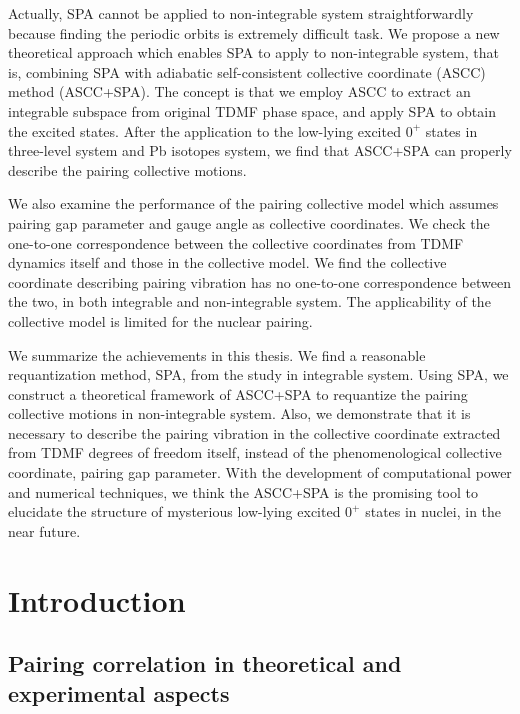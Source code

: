 \documentclass[11pt]{book} %
\begin{document}
Actually, SPA cannot be applied to non-integrable system straightforwardly because finding the periodic orbits is extremely difficult task. We propose a new theoretical approach which enables SPA to apply to non-integrable system, that is, combining SPA with adiabatic self-consistent collective coordinate (ASCC) method (ASCC+SPA). The concept is that we employ ASCC to extract an integrable subspace from original TDMF phase space, and apply SPA to obtain the excited states. 
After the application to the low-lying excited $0^+$ states in three-level system and Pb isotopes system, we find that ASCC+SPA can properly describe the pairing collective motions. 

We also examine the performance of the pairing collective model which assumes pairing gap parameter and gauge angle as collective coordinates. We check the one-to-one correspondence between the collective coordinates from TDMF dynamics itself and those in the collective model. We find the collective coordinate describing pairing vibration has no one-to-one correspondence between the two, in both integrable and non-integrable system. The applicability of the collective model is limited for the nuclear pairing.

We summarize the achievements in this thesis. We find a reasonable requantization method, SPA, from the study in integrable system. Using SPA, we construct a theoretical framework of ASCC+SPA to requantize the pairing collective motions in non-integrable system. Also, we demonstrate that it is necessary to describe the pairing vibration in the collective coordinate extracted from TDMF degrees of freedom itself, instead of the phenomenological collective coordinate, pairing gap parameter. With the development of computational power and numerical techniques, we think 
the ASCC+SPA is the promising tool to elucidate the structure of mysterious low-lying excited $0^+$ states in nuclei, in the near future.

\thispagestyle{empty}

\setcounter{page}{-1}
\tableofcontents

\chapter{Introduction}

\section{Pairing correlation in theoretical and experimental aspects}
\end{document}
